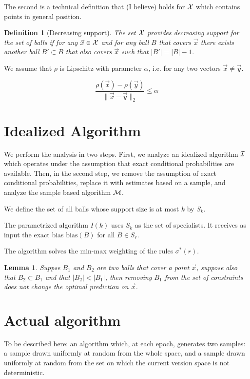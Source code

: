 \documentclass{article}
\newtheorem{lemma}[theorem]{Lemma}
\newtheorem{definition}[theorem]{Definition}
\newcommand{\X}{{\cal X}}
\newcommand{\x}{\vec{x}}
\newcommand{\y}{\vec{y}}
\newcommand{\I}{{\cal I}}
\newcommand{\M}{{\cal M}}
\newcommand{\bias}{\text{bias}}
\begin{document}
The second is a technical definition that (I believe) holds for $\X$ which contains points in
general position.
\begin{definition}[Decreasing support]
The set $\X$ provides decreasing support for the set of balls if for
any $\x \in \X$ and for any ball $B$ that covers $\x$ there exists
another ball $B' \subset B$ that also covers $\x$ such that $|B'| = |B|-1$.
\end{definition}

We assume that $\rho$ is Lipschitz
with parameter $\alpha$, i.e. for any two vectors $\vec{x}\neq\vec{y}$.

$$\frac{\rho(\x)-\rho(\y)}{\|\x-\y\|_2} \leq \alpha$$

\section{Idealized Algorithm}

We perform the analysis in two steps. First, we analyze an idealized
algorithm $\I$
which operates under the assumption that exact conditional
probabilities are available. Then, in the second step, we remove the
assumption of exact conditional probabilities, replace it with
estimates based on a sample, and analyze the sample based algorithm $\M$.

We define the set of all balls whose support size is at most $k$ by $S_k$.

The parametrized algorithm $I(k)$ uses $S_k$ as the set of
specialists.  It receives as input the exact bias $\bias(B)$ for all $B \in S_r$.

The algorithm solves the min-max weighting of the rules $\sigma^*(r)$.

\begin{lemma}
  Suppse $B_1$ and $B_2$ are two balls that cover a point $\x$,
  suppose also that $B_2 \subset B_1$ and that $|B_2| < |B_1|$, then
  removing $B_1$ from the set of constraints does not change the
  optimal prediction on $\x$.
\end{lemma}

\section{Actual algorithm}
To be described here: an algorithm which, at each epoch, generates two
samples: a sample drawn uniformly at random from the whole space, and
a sample drawn uniformly at random from the set on which the current
version space is not deterministic.
\end{document}
